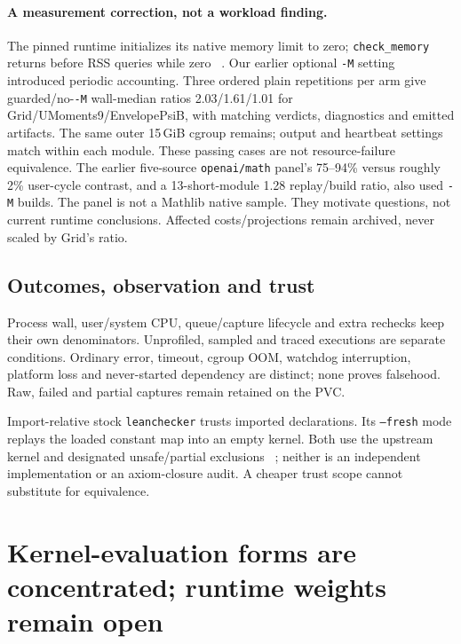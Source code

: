 \documentclass[10pt,twocolumn]{article}
\begin{document}
\paragraph{A measurement correction, not a workload finding.}
The pinned runtime initializes its native memory limit to zero;
\texttt{check\_memory} returns before RSS queries while zero
~\cite{leanMemoryGuard2026}.
Our earlier optional \texttt{-M} setting introduced periodic accounting.
Three ordered plain repetitions per arm give guarded/no-\texttt{-M}
wall-median ratios 2.03/1.61/1.01 for Grid/UMoments9/EnvelopePsiB,
with matching verdicts, diagnostics and emitted artifacts.
The same outer 15\,GiB cgroup remains; output and heartbeat settings match
within each module. These passing cases are not resource-failure equivalence.
The earlier five-source \texttt{openai/math} panel's 75--94\% versus
roughly 2\% user-cycle contrast, and a 13-short-module 1.28 replay/build
ratio, also used \texttt{-M} builds. The panel is not a Mathlib native sample.
They motivate questions, not current runtime conclusions.
Affected costs/projections remain archived, never scaled by Grid's ratio.

\subsection{Outcomes, observation and trust}
Process wall, user/system CPU, queue/capture lifecycle and extra rechecks
keep their own denominators.
Unprofiled, sampled and traced executions are separate conditions.
Ordinary error, timeout, cgroup OOM, watchdog interruption, platform loss and
never-started dependency are distinct; none proves falsehood.
Raw, failed and partial captures remain retained on the PVC.

Import-relative stock \texttt{leanchecker} trusts imported declarations.
Its \texttt{--fresh} mode replays the loaded constant map into an empty kernel.
Both use the upstream kernel and designated unsafe/partial exclusions
~\cite{leanCheckerDocs}; neither is an independent implementation or an
axiom-closure audit. A cheaper trust scope cannot substitute for equivalence.

\section{Kernel-evaluation forms are concentrated; runtime weights remain open}
\label{sec:regimes}
\end{document}
